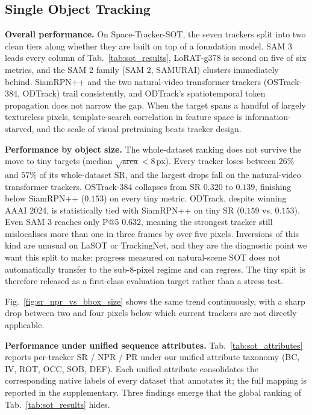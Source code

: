 \documentclass{article}
\newcommand{\subhead}[1]{\noindent\textbf{#1.}}
\begin{document}
\subsection{Single Object Tracking}

\subhead{Overall performance}
\label{sec:exp_sot_overall}
On Space-Tracker-SOT, the seven trackers split into two clean tiers
along whether they are built on top of a foundation model. SAM 3
leads every column of Tab.~\ref{tab:sot_results}, LoRAT-g378 is
second on five of six metrics, and the SAM 2 family (SAM 2, SAMURAI)
clusters immediately behind. SiamRPN++ and the two natural-video
transformer trackers (OSTrack-384, ODTrack) trail consistently, and
ODTrack's spatiotemporal token propagation does not narrow the gap.
When the target spans a handful of largely textureless pixels,
template-search correlation in feature space is information-starved,
and the scale of visual pretraining beats tracker design.



\subhead{Performance by object size}
\label{sec:exp_sot_size}
The whole-dataset ranking does not survive the move to tiny targets
(median $\sqrt{\mathrm{area}} < 8$\,px). Every tracker loses between
$26\%$ and $57\%$ of its whole-dataset SR, and the largest drops
fall on the natural-video transformer trackers. OSTrack-384
collapses from SR $0.320$ to $0.139$, finishing below SiamRPN++
($0.153$) on every tiny metric. ODTrack, despite winning AAAI 2024,
is statistically tied with SiamRPN++ on tiny SR ($0.159$ vs.
$0.153$). Even SAM 3 reaches only P@5 $0.632$, meaning the strongest
tracker still mislocalises more than one in three frames by over
five pixels. Inversions of this kind are unusual on LaSOT or
TrackingNet, and they are the diagnostic point we want this split
to make: progress measured on natural-scene SOT does not
automatically transfer to the sub-8-pixel regime and can regress.
The tiny split is therefore released as a first-class evaluation
target rather than a stress test.

Fig.~\ref{fig:sr_npr_vs_bbox_size} shows the same trend
continuously, with a sharp drop between two and four pixels below
which current trackers are not directly applicable.

\subhead{Performance under unified sequence attributes}
\label{sec:exp_sot_attributes}
Tab.~\ref{tab:sot_attributes} reports per-tracker SR / NPR / PR
under our unified attribute taxonomy (BC, IV, ROT, OCC, SOB, DEF).
Each unified attribute consolidates the corresponding native labels
of every dataset that annotates it; the full mapping is reported in
the supplementary. Three findings emerge that the global ranking of
Tab.~\ref{tab:sot_results} hides.
\end{document}
